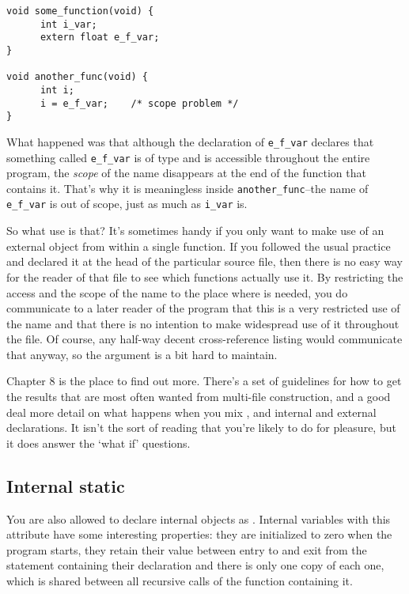 \begin{Verbatim}
void some_function(void) {
      int i_var;
      extern float e_f_var;
}

void another_func(void) {
      int i;
      i = e_f_var;    /* scope problem */
}
\end{Verbatim}

   What happened was that although the declaration of
    \texttt{e\_f\_var} declares that something called \texttt{e\_f\_var}
    is of type \float{} and is accessible throughout the entire
    program, the \textit{scope} of the name disappears at the end of the
    function that contains it. That's why it is meaningless inside
    \texttt{another\_func}--the name of \texttt{e\_f\_var} is out
    of scope, just as much as \texttt{i\_var} is.


   So what use is that? It's sometimes handy if you only want to make use
    of an external object from within a single function. If you followed the
    usual practice and declared it at the head of the particular source
    file, then there is no easy way for the reader of that file to see which
    functions actually use it. By restricting the access and the scope of
    the name to the place where is needed, you do communicate to a later
    reader of the program that this is a very restricted use of the name and
    that there is no intention to make widespread use of it throughout the
    file. Of course, any half-way decent cross-reference listing would
    communicate that anyway, so the argument is a bit hard to maintain.


   Chapter 8 is the place to find out more. There's a set of
    guidelines for how to get the results that are most often wanted from
    multi-file construction, and a good deal more detail on what happens
    when you mix \extern, \static{} and internal and
    external declarations. It isn't the sort of reading that you're likely
    to do for pleasure, but it does answer the `what if'
    questions.

  

  \subsection{Internal static}
   

   You are also allowed to declare internal objects as
    \static. Internal variables with this attribute have some
    interesting properties: they are initialized to zero when the program
    starts, they retain their value between entry to and exit from the
    statement containing their declaration and there is only one copy of
    each one, which is shared between all recursive calls of the function
    containing it.



